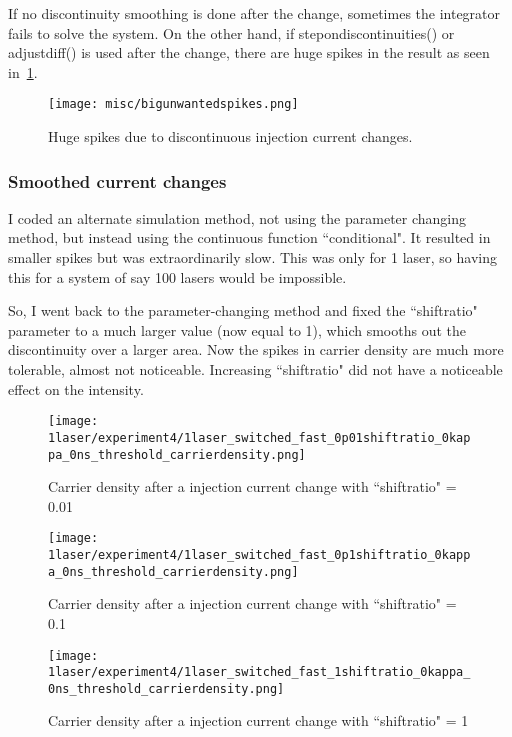 \documentclass[11pt,letterpaper]{article}
\begin{document}
If no discontinuity smoothing is done after the change, sometimes the integrator fails to solve the system. On the other hand, if step\textunderscore on\textunderscore discontinuities() or adjust\textunderscore diff() is used after the change, there are huge spikes in the result as seen in~\ref{bigunwantedspikes}.

\begin{figure}[H]
\centering
\texttt{[image: misc/bigunwantedspikes.png]}
\caption{Huge spikes due to discontinuous injection current changes.\label{bigunwantedspikes}}
\end{figure}

\subsubsection{Smoothed current changes}
I coded an alternate simulation method, not using the parameter changing method, but instead using the continuous function ``conditional". It resulted in smaller spikes but was extraordinarily slow. This was only for 1 laser, so having this for a system of say 100 lasers would be impossible.

So, I went back to the parameter-changing method and fixed the ``shift\textunderscore ratio" parameter to a much larger value (now equal to 1), which smooths out the discontinuity over a larger area. Now the spikes in carrier density are much more tolerable, almost not noticeable. Increasing ``shift\textunderscore ratio" did not have a noticeable effect on the intensity.

\begin{figure}[H]
\centering
\texttt{[image: 1laser/experiment4/1laser\_switched\_fast\_0p01shiftratio\_0kappa\_0ns\_threshold\_carrierdensity.png]}
\caption{Carrier density after a injection current change with ``shift\textunderscore ratio" = 0.01}
\end{figure}

\begin{figure}[H]
\centering
\texttt{[image: 1laser/experiment4/1laser\_switched\_fast\_0p1shiftratio\_0kappa\_0ns\_threshold\_carrierdensity.png]}
\caption{Carrier density after a injection current change with ``shift\textunderscore ratio" = 0.1}
\end{figure}

\begin{figure}[H]
\centering
\texttt{[image: 1laser/experiment4/1laser\_switched\_fast\_1shiftratio\_0kappa\_0ns\_threshold\_carrierdensity.png]}
\caption{Carrier density after a injection current change with ``shift\textunderscore ratio" = 1}
\end{figure}
\end{document}
